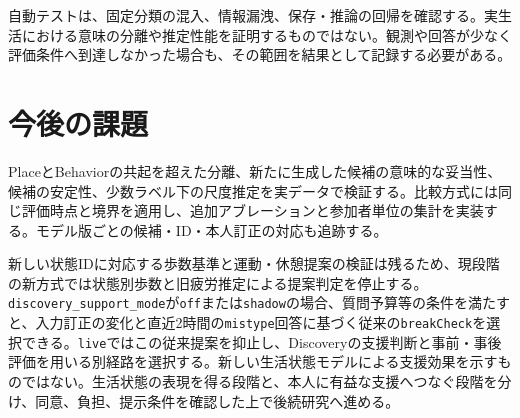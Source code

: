 自動テストは、固定分類の混入、情報漏洩、保存・推論の回帰を確認する。実生活における意味の分離や推定性能を証明するものではない。観測や回答が少なく評価条件へ到達しなかった場合も、その範囲を結果として記録する必要がある。

\section{今後の課題}

PlaceとBehaviorの共起を超えた分離、新たに生成した候補の意味的な妥当性、候補の安定性、少数ラベル下の尺度推定を実データで検証する。比較方式には同じ評価時点と境界を適用し、追加アブレーションと参加者単位の集計を実装する。モデル版ごとの候補・ID・本人訂正の対応も追跡する。

新しい状態IDに対応する歩数基準と運動・休憩提案の検証は残るため、現段階の新方式では状態別歩数と旧疲労推定による提案判定を停止する。\texttt{discovery\_support\_mode}が\texttt{off}または\texttt{shadow}の場合、質問予算等の条件を満たすと、入力訂正の変化と直近2時間の\texttt{mistype}回答に基づく従来の\texttt{breakCheck}を選択できる。\texttt{live}ではこの従来提案を抑止し、Discoveryの支援判断と事前・事後評価を用いる別経路を選択する。新しい生活状態モデルによる支援効果を示すものではない。生活状態の表現を得る段階と、本人に有益な支援へつなぐ段階を分け、同意、負担、提示条件を確認した上で後続研究へ進める。
